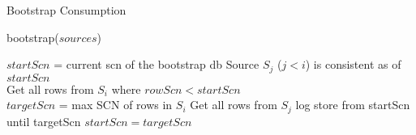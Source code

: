 
\begin{algorithm}
\label{alg:bootstrap}
\caption{Bootstrap Consumption}{bootstrap}{($sources$)} 
\begin{algorithmic}
\STATE $startScn$ = current scn of the bootstrap db
\REQUIRE Source $S_{j}$ ($j < i$) is consistent as of $startScn$ \\
\STATE Get all rows from $S_{i}$ where $rowScn < startScn$ \\
\STATE $targetScn$ = max SCN of rows in $S_{i}$
\STATE Get all rows from $S_{j}$ log store from startScn until targetScn
\ENDFOR
\STATE $startScn = targetScn$
\ENDFOR
\end{algorithmic}
\end{algorithm}

